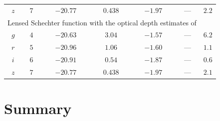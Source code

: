 \documentclass[]{pasj01}
\begin{document}
\begin{table}
{\begin{tabular}{ccccccc}
      $z$ & $7$ & $-20.77$ & $0.438$ & $-1.97$ & --- & $2.2$ \\
      \multicolumn{6}{c}{Lensed Schechter function with the optical depth estimates of \citet{2015MNRAS.450.1224B}} \\
      $g$ & $4$ & $-20.63$ & $3.04$ & $-1.57$ & --- & $6.2$ \\
      $r$ & $5$ & $-20.96$ & $1.06$ & $-1.60$ & --- & $1.1$ \\
      $i$ & $6$ & $-20.91$ & $0.54$ & $-1.87$ & --- & $0.6$ \\
      $z$ & $7$ & $-20.77$ & $0.438$ & $-1.97$ & --- & $2.1$ \\
      \hline
    \end{tabular}}\label{tab:LF_best_fit_parameters}
\end{table}



\section{Summary} \label{sec:summary}
\end{document}
